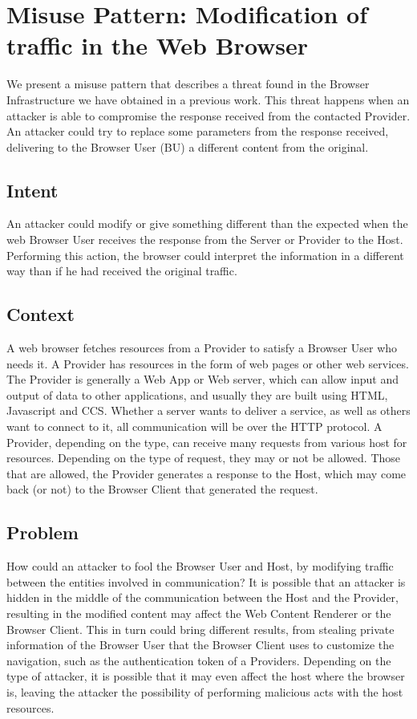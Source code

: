 \documentclass{sig-alternate-05-2015}
\begin{document}
\section{Misuse Pattern: Modification of traffic in the Web Browser}
We present a misuse pattern that describes a threat found in the Browser Infrastructure we have obtained in a previous work. This threat happens when an attacker is able to compromise the response received from the contacted Provider. An attacker could try to replace some parameters from the response received, delivering to the Browser User (BU) a different content from the original.

\subsection*{Intent}
An attacker could modify or give something different than the expected when the web Browser User receives the response from the Server or Provider to the Host. Performing this action, the browser could interpret the information in a different way than if he had received the original traffic.

\subsection*{Context}
A web browser fetches resources from a Provider to satisfy a Browser User who needs it. A Provider has resources in the form of web pages or other web services. The Provider is generally a Web App or Web server, which can allow input and output of data to other applications, and usually they are built using HTML, Javascript and CCS. Whether a server wants to deliver a service, as well as others want to connect to it, all communication will be over the HTTP protocol. A Provider, depending on the type, can receive many requests from various host for resources. Depending on the type of request, they may or not be allowed. Those that are allowed, the Provider generates a response to the Host, which may come back (or not) to the Browser Client that generated the request.

\subsection*{Problem}
How could an attacker to fool the Browser User and Host, by modifying traffic between the entities involved in communication? It is possible that an attacker is hidden in the middle of the communication between the Host and the Provider, resulting in the modified content  may affect the Web Content Renderer or the Browser Client. This in turn could bring different results, from stealing private information of the Browser User that the Browser Client uses to customize the navigation, such as the authentication token of a Providers. Depending on the type of attacker, it is possible that it may even affect the host where the browser is, leaving the attacker the possibility of performing malicious acts with the host resources.
\end{document}
